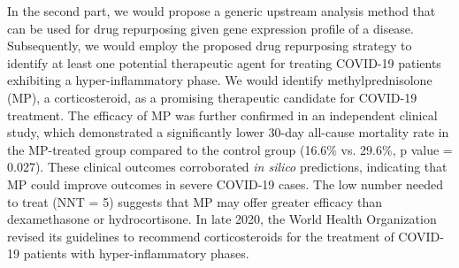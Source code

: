 %

%


In the second part, we would propose a generic upstream analysis method that can be used for drug repurposing given gene expression profile of a disease.
Subsequently, we would employ the proposed drug repurposing strategy to identify at least one potential therapeutic agent for treating COVID-19 patients exhibiting a hyper-inflammatory phase.
We would identify methylprednisolone (MP), a corticosteroid, as a promising therapeutic candidate for COVID-19 treatment. The efficacy of MP was further confirmed in an independent clinical study, which demonstrated a significantly lower 30-day all-cause mortality rate in the MP-treated group compared to the control group (16.6\% vs. 29.6\%,  p value = 0.027). These clinical outcomes corroborated \textit{in silico} predictions, indicating that MP could improve outcomes in severe COVID-19 cases. The low number needed to treat (NNT = 5) suggests that MP may offer greater efficacy than dexamethasone or hydrocortisone. In late 2020, the World Health Organization revised its guidelines to recommend corticosteroids for the treatment of COVID-19 patients with hyper-inflammatory phases.


